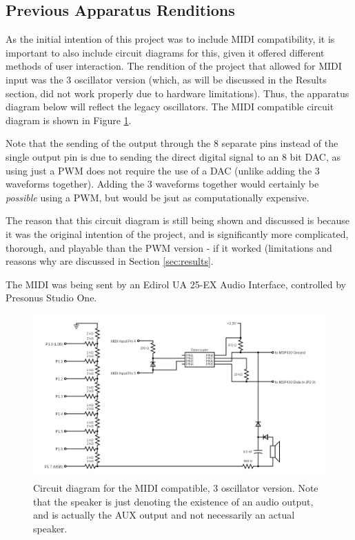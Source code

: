 \subsection{Previous Apparatus Renditions}\label{subsec:previous-apparatus-renditions}

As the initial intention of this project was to include MIDI compatibility, it is important to also include circuit diagrams for this, given it offered different methods of user interaction.
The rendition of the project that allowed for MIDI input was the 3 oscillator version (which, as will be discussed in the Results section, did not work properly due to hardware limitations).
Thus, the apparatus diagram below will reflect the legacy oscillators. The MIDI compatible circuit diagram is shown in Figure \ref{fig:3oscillatordiagram}. 

Note that the sending of the output through the 8 separate pins instead of the single output pin is due to sending the direct digital signal to an 8 bit DAC, as using just a PWM does not require the use of a DAC (unlike adding the 3 waveforms together). 
Adding the 3 waveforms together would certainly be \textit{possible} using a PWM, but would be jsut as computationally expensive. 

The reason that this circuit diagram is still being shown and discussed is because it was the original intention of the project, and is significantly more complicated, thorough, and playable than the PWM version - if it worked (limitations and reasons why are discussed in Section \ref{sec:results}. 

The MIDI was being sent by an Edirol UA 25-EX Audio Interface, controlled by Presonus Studio One. 

\begin{figure}
    \centering
    \includegraphics[width = 0.98 \textwidth]{midicircuit.png}
    \caption{Circuit diagram for the MIDI compatible, 3 oscillator version. Note that the speaker is just denoting the existence of an audio output, and is actually the AUX output and not necessarily an actual speaker.}
    \label{fig:3oscillatordiagram}
\end{figure}